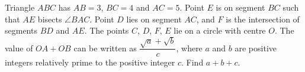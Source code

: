 Triangle $ABC$ has $AB=3$, $BC=4$ and $AC=5$. Point $E$ is on segment $BC$ such that $AE$ bisects $\angle BAC$. Point $D$ lies on segment $AC$, and $F$ is the intersection of segments $BD$ and $AE$. The points $C$, $D$, $F$, $E$ lie on a circle with centre $O$. The value of $OA+OB$ can be written as $\dfrac{\sqrt a+\sqrt b}{c}$, where $a$ and $b$ are positive integers relatively prime to the positive integer $c$. Find $a+b+c$.
